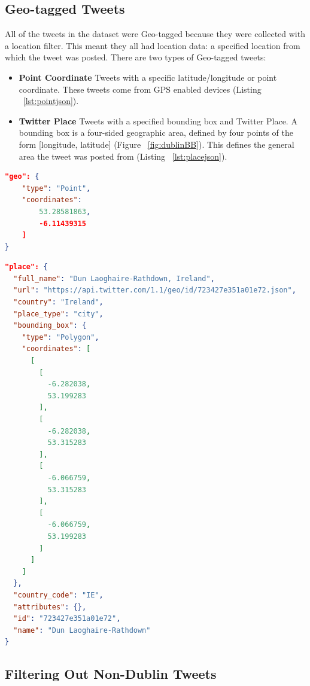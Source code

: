 \subsection{Geo-tagged Tweets}

All of the tweets in the dataset were Geo-tagged because they were collected with a location filter. This meant they all had location data: a specified location from which the tweet was posted. There are two types of Geo-tagged tweets:
\begin{itemize}
    \item \textbf{Point Coordinate}\newline
    Tweets with a specific latitude/longitude or point coordinate. These tweets come from GPS enabled devices (Listing ~\ref{lst:pointjson}).
    \item \textbf{Twitter Place}\newline
    Tweets with a specified bounding box and Twitter Place. A bounding box is a four-sided geographic area, defined by four points of the form [longitude, latitude] (Figure ~\ref{fig:dublinBB}). This defines the general area the tweet was posted from (Listing ~\ref{lst:placejson}). \newline
\end{itemize}

\begin{lstlisting}[caption={Geo-tagged Tweet with Point Coordinate},
captionpos=b,label=lst:pointjson,language=json,firstnumber=1]
"geo": {
    "type": "Point",
    "coordinates": 
        53.28581863,
        -6.11439315
    ]
}
\end{lstlisting}

\begin{lstlisting}[caption={Geo-tagged Tweet with Twitter Place},captionpos=b,label=lst:placejson,language=json,firstnumber=1]
"place": {
  "full_name": "Dun Laoghaire-Rathdown, Ireland",
  "url": "https://api.twitter.com/1.1/geo/id/723427e351a01e72.json",
  "country": "Ireland",
  "place_type": "city",
  "bounding_box": {
    "type": "Polygon",
    "coordinates": [
      [
        [
          -6.282038,
          53.199283
        ],
        [
          -6.282038,
          53.315283
        ],
        [
          -6.066759,
          53.315283
        ],
        [
          -6.066759,
          53.199283
        ]
      ]
    ]
  },
  "country_code": "IE",
  "attributes": {},
  "id": "723427e351a01e72",
  "name": "Dun Laoghaire-Rathdown"
}
\end{lstlisting}

\subsection{Filtering Out Non-Dublin Tweets}

